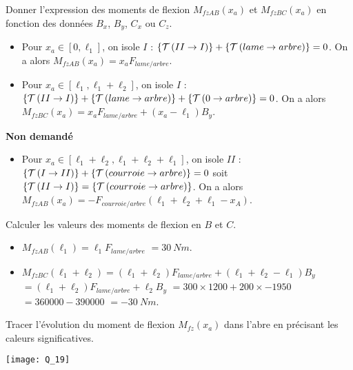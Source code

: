 \documentclass[11pt]{article}
\begin{document}
\UPSTIquestion Donner l'expression des moments de flexion $M_{fzAB}(x_a)$ et $M_{fzBC}(x_a)$ en fonction des données $B_x$, $B_y$, $C_x$ ou $C_z$.

\begin{UPSTIcorrige}
\begin{itemize}
\item Pour $x_a \in [0,\ell_1]$, on isole $I$ : $\left\{\mathcal{T} \left(II\rightarrow I \right) \right\} + \left\{\mathcal{T} \left(lame\rightarrow arbre \right) \right\} = 0$.  On  a alors 
$M_{fz AB}(x_a) = x_a  F_{lame/arbre}$. 
\item Pour $x_a \in [\ell_1, \ell_1+\ell_2]$, on isole $I$ : $\left\{\mathcal{T} \left(II\rightarrow I \right) \right\} + \left\{\mathcal{T} \left(lame\rightarrow arbre \right) \right\} + \left\{\mathcal{T} \left(0\rightarrow arbre \right) \right\} = 0$.
On  a alors $M_{fz BC}(x_a) = x_a  F_{lame/arbre} + \left(x_a - \ell_1\right) B_y$. 
\end{itemize}

\textbf{Non demandé}
\begin{itemize}
\item Pour $x_a \in [\ell_1+\ell_2,\ell_1+\ell_2+\ell_1]$, on isole $II$ : $\left\{\mathcal{T} \left(I\rightarrow II \right) \right\} + \left\{\mathcal{T} \left(courroie\rightarrow arbre \right) \right\} = 0$ soit $\left\{\mathcal{T} \left(II\rightarrow I \right) \right\} =\left\{\mathcal{T} \left(courroie\rightarrow arbre \right) \right\} $.  On  a alors 
$M_{fz AB}(x_a) = -  F_{courroie/arbre} (\ell_1+\ell_2+\ell_1-x_A)$. 
\end{itemize}

\end{UPSTIcorrige}

\UPSTIquestion Calculer les valeurs des moments de flexion en $B$ et $C$.

\begin{UPSTIcorrige}
\begin{itemize}
\item $M_{fz AB}(\ell_1) = \ell_1  F_{lame/arbre}$ $=\SI{30}{Nm}$.
\item $M_{fz BC}(\ell_1+\ell_2) =(\ell_1+\ell_2)  F_{lame/arbre} + \left(\ell_1+\ell_2 - \ell_1\right) B_y$
$=(\ell_1+\ell_2)  F_{lame/arbre}  +\ell_2 B_y$
$=300\times 1200+200 \times -1950$
$= 360 000-390 000$
$= -\SI{30}{Nm}$.
\end{itemize}

\end{UPSTIcorrige}

\UPSTIquestion Tracer l'évolution du moment de flexion $M_{fz}(x_a)$ dans l'abre en précisant les caleurs significatives. 

\begin{UPSTIcorrige}
\begin{center}
\texttt{[image: Q\_19]}
\end{center}
\end{UPSTIcorrige}
\end{document}
